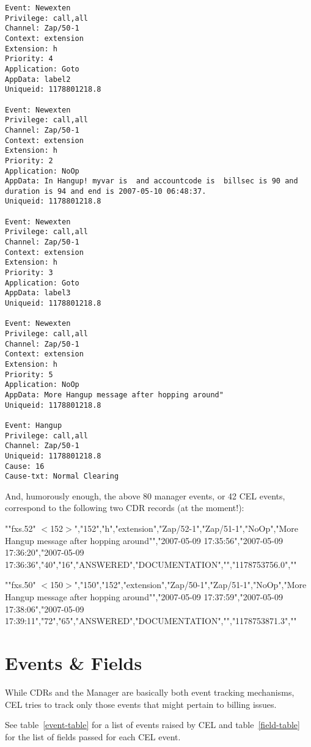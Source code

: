 \begin{astlisting}
\begin{verbatim}
Event: Newexten
Privilege: call,all
Channel: Zap/50-1
Context: extension
Extension: h
Priority: 4
Application: Goto
AppData: label2
Uniqueid: 1178801218.8

Event: Newexten
Privilege: call,all
Channel: Zap/50-1
Context: extension
Extension: h
Priority: 2
Application: NoOp
AppData: In Hangup! myvar is  and accountcode is  billsec is 90 and duration is 94 and end is 2007-05-10 06:48:37.
Uniqueid: 1178801218.8

Event: Newexten
Privilege: call,all
Channel: Zap/50-1
Context: extension
Extension: h
Priority: 3
Application: Goto
AppData: label3
Uniqueid: 1178801218.8

Event: Newexten
Privilege: call,all
Channel: Zap/50-1
Context: extension
Extension: h
Priority: 5
Application: NoOp
AppData: More Hangup message after hopping around"
Uniqueid: 1178801218.8

Event: Hangup
Privilege: call,all
Channel: Zap/50-1
Uniqueid: 1178801218.8
Cause: 16
Cause-txt: Normal Clearing
\end{verbatim}
\end{astlisting}

And, humorously enough, the above 80 manager events, or 42 CEL events,
correspond to the following two CDR records (at the moment!):

\begin{astlisting}
""fxs.52" $<$152$>$","152","h","extension","Zap/52-1","Zap/51-1","NoOp","More Hangup message after hopping around"","2007-05-09 17:35:56","2007-05-09 17:36:20","2007-05-09 17:36:36","40","16","ANSWERED","DOCUMENTATION","","1178753756.0",""

""fxs.50" $<$150$>$","150","152","extension","Zap/50-1","Zap/51-1","NoOp","More Hangup message after hopping around"","2007-05-09 17:37:59","2007-05-09 17:38:06","2007-05-09 17:39:11","72","65","ANSWERED","DOCUMENTATION","","1178753871.3",""
\end{astlisting}


\section{Events \& Fields}

While CDRs and the Manager are basically both event tracking mechanisms, CEL
tries to track only those events that might pertain to billing issues.

See table~\ref{event-table} for a list of events raised by CEL and
table~\ref{field-table} for the list of fields passed for each CEL event.

